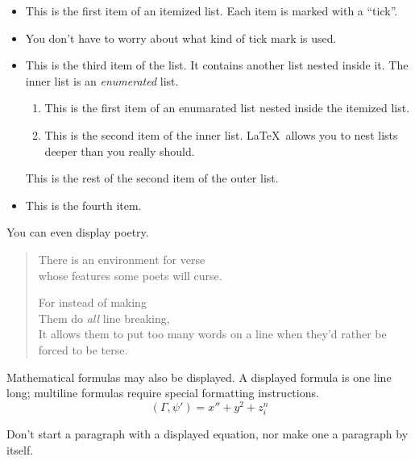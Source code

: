 \documentclass{article}
\newcommand{\ip}[2]{(#1, #2)}
\begin{document}
\begin{itemize}
\item This is the first item of an itemized list.  Each item is marked with
a ``tick''.
\item You don't have to worry about what kind of tick mark is used.
\item This is the third item of the list.  It contains another list nested
inside it.  The inner list is an \emph{enumerated} list.
\begin{enumerate}
\item This is the first item of an enumarated list nested inside the itemized
list.
\item This is the second item of the inner list.  \LaTeX\ allows you to nest
lists deeper than you really should.
\end{enumerate}
This is the rest of the second item of the outer list.
\item This is the fourth item.
\end{itemize}

You can even display poetry.
\begin{verse}
There is an environment for verse \\  %
whose features some poets             %
will curse.

For instead of making\\
Them do \emph{all} line breaking,\\
It allows them to put too many words on a line when they'd rather be forced to
be terse.
\end{verse}

Mathematical formulas may also be displayed.  A displayed formula is one line
long; multiline formulas require special formatting instructions.
\[ \ip{\Gamma}{\psi'} = x'' + y^{2} + z_{i}^{n} \]

Don't start a paragraph with a displayed equation, nor make one a paragraph
by itself.
\end{document}
